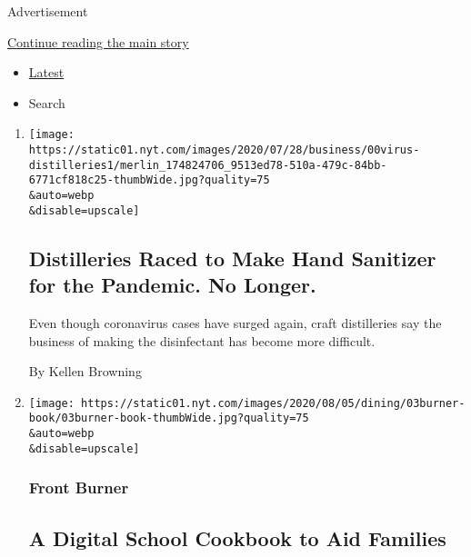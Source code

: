 Advertisement

\protect\hyperlink{after-mid1}{Continue reading the main story}

\begin{itemize}
\tightlist
\item
  \protect\hyperlink{stream-panel}{Latest}
\item
  Search
\end{itemize}

\begin{enumerate}
\def\labelenumi{\arabic{enumi}.}
\item
  \href{/2020/08/04/business/distilleries-hand-sanitizer-pandemic.html}{}

  \texttt{[image: https://static01.nyt.com/images/2020/07/28/business/00virus-distilleries1/merlin\_174824706\_9513ed78-510a-479c-84bb-6771cf818c25-thumbWide.jpg?quality=75\\\&auto=webp\\\&disable=upscale]}

  \hypertarget{distilleries-raced-to-make-hand-sanitizer-for-the-pandemic-no-longer}{%
  \subsection{Distilleries Raced to Make Hand Sanitizer for the
  Pandemic. No
  Longer.}\label{distilleries-raced-to-make-hand-sanitizer-for-the-pandemic-no-longer}}

  Even though coronavirus cases have surged again, craft distilleries
  say the business of making the disinfectant has become more difficult.

  By Kellen Browning
\item
  \href{/2020/08/03/dining/martin-van-buren-high-school-cookbook.html}{}

  \texttt{[image: https://static01.nyt.com/images/2020/08/05/dining/03burner-book/03burner-book-thumbWide.jpg?quality=75\\\&auto=webp\\\&disable=upscale]}

  \hypertarget{front-burner-1}{%
  \subsubsection{Front Burner}\label{front-burner-1}}

  \hypertarget{a-digital-school-cookbook-to-aid-families}{%
  \subsection{A Digital School Cookbook to Aid
  Families}\label{a-digital-school-cookbook-to-aid-families}}


\end{enumerate}

